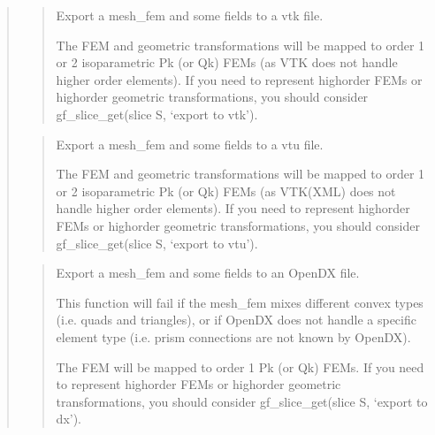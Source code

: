 \documentclass[a4paper,11pt,english]{sphinxmanual}
\begin{document}
\begin{quote}
\begin{quote}
\sphinxAtStartPar
Export a mesh\_fem and some fields to a vtk file.

\sphinxAtStartPar
The FEM and geometric transformations will be mapped to order 1
or 2 isoparametric Pk (or Qk) FEMs (as VTK does not handle higher
order elements). If you need to represent high\sphinxhyphen{}order FEMs or
high\sphinxhyphen{}order geometric transformations, you should consider
gf\_slice\_get(slice S, ‘export to vtk’).
\end{quote}

\sphinxAtStartPar
{}
\begin{quote}

\sphinxAtStartPar
Export a mesh\_fem and some fields to a vtu file.

\sphinxAtStartPar
The FEM and geometric transformations will be mapped to order 1
or 2 isoparametric Pk (or Qk) FEMs (as VTK(XML) does not handle higher
order elements). If you need to represent high\sphinxhyphen{}order FEMs or
high\sphinxhyphen{}order geometric transformations, you should consider
gf\_slice\_get(slice S, ‘export to vtu’).
\end{quote}

\sphinxAtStartPar
{}
\begin{quote}

\sphinxAtStartPar
Export a mesh\_fem and some fields to an OpenDX file.

\sphinxAtStartPar
This function will fail if the mesh\_fem mixes different convex types
(i.e. quads and triangles), or if OpenDX does not handle a specific
element type (i.e. prism connections are not known by OpenDX).

\sphinxAtStartPar
The FEM will be mapped to order 1 Pk (or Qk) FEMs. If you need to
represent high\sphinxhyphen{}order FEMs or high\sphinxhyphen{}order geometric transformations,
you should consider gf\_slice\_get(slice S, ‘export to dx’).
\end{quote}


\end{quote}
\end{document}
